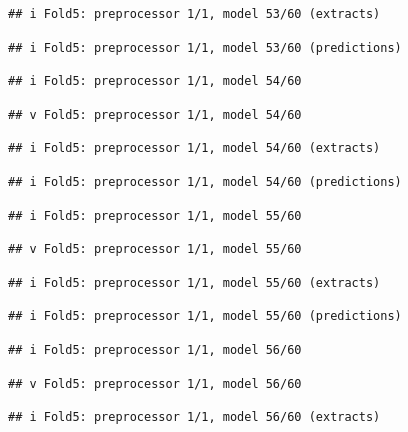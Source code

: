 \documentclass[
]{article}
\begin{document}
\begin{verbatim}
## i Fold5: preprocessor 1/1, model 53/60 (extracts)
\end{verbatim}

\begin{verbatim}
## i Fold5: preprocessor 1/1, model 53/60 (predictions)
\end{verbatim}

\begin{verbatim}
## i Fold5: preprocessor 1/1, model 54/60
\end{verbatim}

\begin{verbatim}
## v Fold5: preprocessor 1/1, model 54/60
\end{verbatim}

\begin{verbatim}
## i Fold5: preprocessor 1/1, model 54/60 (extracts)
\end{verbatim}

\begin{verbatim}
## i Fold5: preprocessor 1/1, model 54/60 (predictions)
\end{verbatim}

\begin{verbatim}
## i Fold5: preprocessor 1/1, model 55/60
\end{verbatim}

\begin{verbatim}
## v Fold5: preprocessor 1/1, model 55/60
\end{verbatim}

\begin{verbatim}
## i Fold5: preprocessor 1/1, model 55/60 (extracts)
\end{verbatim}

\begin{verbatim}
## i Fold5: preprocessor 1/1, model 55/60 (predictions)
\end{verbatim}

\begin{verbatim}
## i Fold5: preprocessor 1/1, model 56/60
\end{verbatim}

\begin{verbatim}
## v Fold5: preprocessor 1/1, model 56/60
\end{verbatim}

\begin{verbatim}
## i Fold5: preprocessor 1/1, model 56/60 (extracts)
\end{verbatim}
\end{document}
